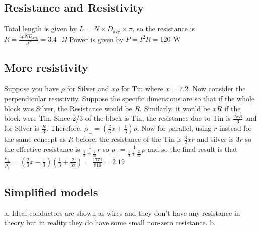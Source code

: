 \documentclass{article}
\begin{document}
\subsection{Resistance and Resistivity}
Total length is given by $L=N \times D_{\text{avg}} \times \pi$, so the resistance is $R=\frac{4\rho N D_{\text{avg}}}{ d^2}=3.4 \text{ }\Omega$
\newline
Power is given by $P=I^2 R = 120 \text{ W}$
\subsection{More resistivity}
Suppose you have $\rho$ for Silver and $x \rho$ for Tin where $x=7.2$. Now consider the perpendicular resistivity. Suppose the specific dimensions are so that if the whole block was Silver, the Resistance would be $R$. Similarly, it would be $xR$ if the block were Tin. Since 2/3 of the block is Tin, the resistance due to Tin is $\frac{2xR}{3}$ and for Silver is $\frac{R}{3}$. Therefore, $\rho_{\perp}=\left(\frac{2}{3}x + \frac{1}{3}\right)\rho$. Now for parallel, using $r$ instead for the same concept as $R$ before, the resistance of the Tin is $\frac{3}{2} xr$ and silver is $3r$ so the effective resistance is $\frac{1}{\frac{1}{3}+\frac{2}{3x}}r$ so $\rho_\parallel = \frac{1}{\frac{1}{3}+\frac{2}{3x}} \rho$ and so the final result is that $\frac{\rho_\perp}{\rho_\parallel}=(\frac{2}{3}x + \frac{1}{3})(\frac{1}{3}+\frac{2}{3x})=\frac{1771}{810}=2.19$
\subsection{Simplified models}
a. Ideal conductors are shown as wires and they don't have any resistance in theory but in reality they do have some small non-zero resistance.
\newline
b. 
\end{document}
